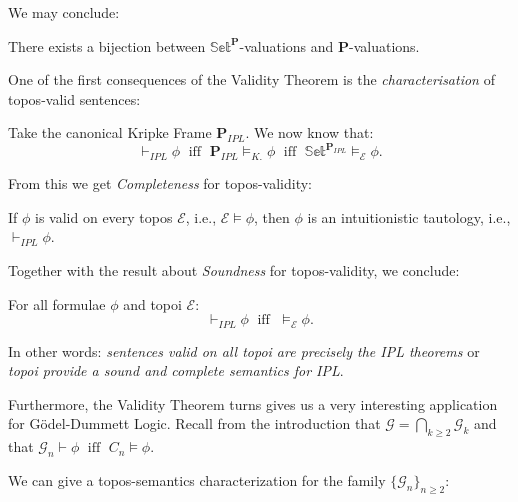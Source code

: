 We may conclude:

\begin{remark}
	There exists a bijection between $\mathbb{Set}^\textbf{P}$-valuations and $\textbf{P}$-valuations.
\end{remark}
 
One of the first consequences of the Validity Theorem is the \emph{characterisation} of topos-valid sentences:

\begin{prop}
	Take the canonical Kripke Frame $\textbf{P}_{IPL}$. We now know that:
	\begin{equation*}
		\vdash_{IPL} \phi \;\text{ iff }\; \textbf{P}_{IPL} \models_{K.} \phi  \;\text{ iff }\; \mathbb{Set}^{\textbf{P}_{IPL}} \models_{\mathcal{E}} \phi.
	\end{equation*}
\end{prop}

From this we get \emph{Completeness} for topos-validity:

\begin{thm}
	If $\phi$ is valid on every topos $\mathcal{E}$, i.e., $\mathcal{E} \models \phi$, then
	$\phi$ is an intuitionistic tautology, i.e., $\vdash_{IPL} \phi$.
\end{thm}

Together with the result about \emph{Soundness} for topos-validity, we conclude:

\begin{thm}\label{soundcompl}
	For all formulae $\phi$ and topoi $\mathcal{E}$:
	\begin{equation*}
		\vdash_{IPL} \phi \; \text{ iff } \; \models_\mathcal{E} \phi.
	\end{equation*}
\end{thm}
In other words: \emph{sentences valid on all topoi are precisely the IPL theorems} or \emph{topoi provide a sound and complete semantics for IPL}.\newline

Furthermore, the Validity Theorem turns gives us a very interesting application for Gödel-Dummett Logic.\newline
Recall from the introduction that $\mathcal{G} = \bigcap_{k\geq2} \mathcal{G}_k$ and that $\mathcal{G}_n \vdash \phi \;\text{ iff }\; C_n \models \phi$. \newline

We can give a topos-semantics characterization for the family $\{\mathcal{G}_n\}_{n \geq 2}$:

